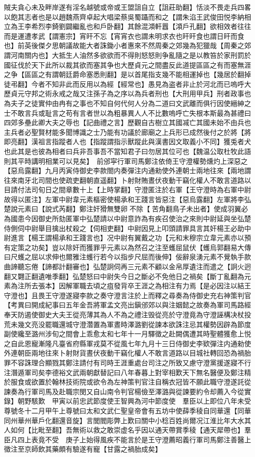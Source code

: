 賊夫貪心未及畔岸遂有淫名越號或帝或王盟詛自立【詛莊助翻】恬淡不畏走兵四畧以飽其志者也是以趙魏燕齊卓起大唱梁蔡吳蜀躡而和之【謂朱淊王武俊田悦李納相立為王李希烈李錡劉闢繼亂也和戶卧翻】其餘混澒軒囂【澒戶孔翻】欲相效者往往而是運遭孝武【謂憲宗】宵旰不忘【宵宵衣也謂未明求衣也旰旰食也謂日旰而食也】前英後傑夕思朝議故能大者誅鋤小者惠來不然周秦之郊幾為犯獵哉【周秦之郊謂河南關内也】大抵生人油然多欲欲而不得則怒怒則争亂隨之是以教笞於家刑罰於國征伐於天下此所以裁其欲而塞其争也大歷貞元之間盡反此道提區區之有而塞無涯之争【區區之有謂朝廷爵命塞悉則翻】是以首尾指支幾不能相運掉也【幾居於翻掉徒弔翻】今者不知非此而反用以為經【經常也】愚見為盗者非止於河北而已嗚呼大歷貞元守邦之術永戒之哉又注孫子為之序以為兵者刑也【大刑用甲兵】刑者政事也為夫子之徒實仲由冉有之事也不知自何代何人分為二道曰文武離而俱行因使縉紳之士不敢言兵或耻言之苟有言者世以為粗暴異人人不比數嗚呼亡失根本斯最為甚禮曰四郊多壘此卿大夫之辱也【記曲禮之言】歷觀自古樹立其國㓕亡其國未始不由兵也主兵者必聖賢材能多聞博識之士乃能有功議於廊廟之上兵形已成然後付之於將【將即亮翻】漢祖言指蹤者人也【指蹤謂指示獸蹤此與漢書因文取義小不同】獲兎者犬也此其是也彼為相者曰兵非吾事吾不當知君子曰勿居其位可也【魏温公取杜牧此語則其平時講明相業可以見矣】　前邠寜行軍司馬鄭注依倚王守澄權勢燻灼上深惡之【惡烏露翻】九月丙寅侍御史李款閤内奏彈注内通勑使外連朝士兩地往來【兩地謂往來南牙北司間也使疏吏翻朝直遥翻】卜射財賄晝伏夜動干竊化權人不敢言道路以目請付法司旬日之間章數十上【上時掌翻】守澄匿注於右軍【王守澄時為右軍中尉故得以匿注】左軍中尉韋元素樞密使楊承和王踐言皆惡注【惡烏露翻】左軍將李弘楚說元素曰【說式芮翻】鄭注奸猾無雙卵不除【苦角翻鳥子未出者】使成羽翼必為國患今因御史所劾匿軍中弘楚請以中尉意詐為有疾召使治之來則中尉延與坐弘楚侍側伺中尉舉目擒出杖殺之【伺相吏翻】中尉因見上叩頭請罪具言其奸楊王必助中尉進言【楊王謂楊承和王踐言也】况中尉有翼戴之功【元和末穆宗立韋元素亦以預有定策之功矣】豈以除奸而獲罪乎元素以為然召之注至蠖屈鼠伏【蠖烏郭翻易大傳曰尺蠖之屈以求伸也爾雅注蠖行若今以指步尺屈而後伸】佞辭泉湧元素不覺執手款曲諦聽忘倦【諦都計翻審也】弘楚詗伺再三元素不顧以金帛厚遺注而遣之【詗火迥翻又翾正翻遺唯季翻】弘楚怒曰中尉失今日之斷必不免他日之禍矣【斷丁亂翻為元素為注所去張本】因解軍職去頃之疽發背卒王涯之為相注有力焉【是必因注以結王守澄也】且畏王守澄遂寢李款之奏守澄言注於上而釋之尋奏為侍御史充右神策判官　【考異曰開成紀事曰五年金吾將軍孟文亮出鎭邠郊以與注姻懿之故奏為軍司馬路經奉天防遏使御史大夫王從亮薄其為人不為之禮注毁從亮於守澄竟為守澄誣構决杖投荒未幾文亮没罷職還城守澄濳置為軍晝時澤潞劉從諫本欲誅注忌其權勢因辟為節度副使纔至潞州涉旬之間會上乖愈太和七年十一月驛徵之赴闕偶遭其時聖體獲愈上悦之自此恩寵漸隆凡臺省府縣軍戎莫不從風七年九月十三日侍御史李欵彈注内通勑使外連朝臣兩地往來卜射財貨晝伏夜動干竊化權人不敢言道路以目城社轉回恐為禍胎罪不容誅理合顯戮其鄭注請付有司時王涯重處台司注之所致又慮守澄黨援遂寢不行注潛遁軍司矣李德裕文武兩朝獻替記曰八年春暮上對宰相歎天下無名醫便及鄭注精於服食或欲置於翰林技術院或欲令為左神策判官注自稱衣冠皆不願此職守澄遂託從諫奏為行軍司馬及赴職宗閔又自山南令判官楊儉至澤潞與從諫要約令却薦入今從實錄】朝野駭歎　甲寅以前忠武節度使王智興為河中節度使　羣臣以上即位八年未受尊號冬十二月甲午上尊號曰太和文武仁聖皇帝會有五坊中使薛季稜自同華還【同華同州華州華戶化翻還音旋】言閭閻彫弊上歎曰關中小稔百姓尚爾况江淮比年大水其人如何【比毗至翻】吾無術以救之敢崇虚名乎因以通天帶賞季稜【通天犀帶也】羣臣凡四上表竟不受　庚子上始得風疾不能言於是王守澄薦昭義行軍司馬鄭注善醫上徵注至京師飲其藥頗有驗遂有寵【甘露之禍胎成矣】


